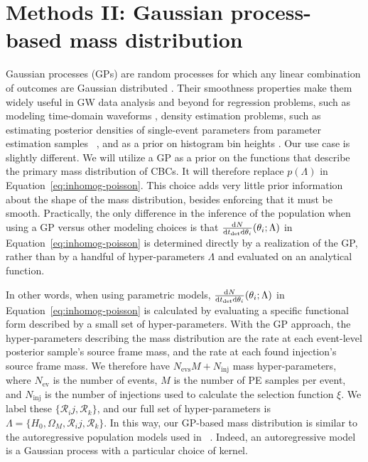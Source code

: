 \documentclass[]{aastex631}
\begin{document}
\section{Methods II: Gaussian process-based mass distribution}
\label{sec:model}
Gaussian processes (GPs) are random processes for which any linear combination of outcomes are Gaussian distributed \citep{rasmussen_gaussian_2006}.
Their smoothness properties make them widely useful in GW data analysis and beyond for regression problems, such as modeling time-domain waveforms \citep{zoheyr, huerta}, density estimation problems, such as estimating posterior densities of single-event parameters from parameter estimation samples ~\citep{dangelo}, and as a prior on histogram bin heights \citep{ray_2023,li_flexible_2021}.
Our use case is slightly different.
We will utilize a GP as a prior on the functions that describe the primary mass distribution of CBCs.
It will therefore replace $p(\Lambda)$ in Equation~\ref{eq:inhomog-poisson}.
This choice adds very little prior information about the shape of the mass distribution, besides enforcing that it must be smooth.
Practically, the only difference in the inference of the population when using a GP versus other modeling choices is that $\frac{\text{d} N}{\text{d} t_{\det} \text{d} \theta_i} (\theta_i;\Lambda)$ in Equation~\ref{eq:inhomog-poisson} is determined directly by a realization of the GP, rather than by a handful of hyper-parameters $\Lambda$ and evaluated on an analytical function.

In other words, when using parametric models, $\frac{\text{d} N}{\text{d} t_{\det} \text{d} \theta_i} (\theta_i;\Lambda)$ in Equation~\ref{eq:inhomog-poisson} is calculated by evaluating a specific functional form described by a small set of hyper-parameters. 
With the GP approach, the hyper-parameters describing the mass distribution are the rate at each event-level posterior sample's source frame mass, and the rate at each found injection's source frame mass.
We therefore have $N_{\text{evs}}M + N_{\text{inj}}$ mass hyper-parameters, where $N_{\text{ev}}$ is the number of events, $M$ is the number of PE samples per event, and $N_{\text{inj}}$ is the number of injections used to calculate the selection function $\xi$.
We label these $\{\mathcal{R}_ij,\mathcal{R}_k\}$, and our full set of hyper-parameters is $\Lambda=\{H_0, \Omega_M, \mathcal{R}_ij,\mathcal{R}_k\}$. 
In this way, our GP-based mass distribution is similar to the autoregressive population models used in ~\citet{callister_ar}.
Indeed, an autoregressive model is a Gaussian process with a particular choice of kernel.
\end{document}
